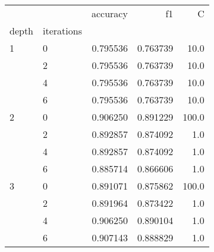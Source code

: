 \begin{tabular}{llrrr}
\toprule
  &   &  accuracy &        f1 &      C \\
depth & iterations &           &           &        \\
\midrule
1 & 0 &  0.795536 &  0.763739 &   10.0 \\
  & 2 &  0.795536 &  0.763739 &   10.0 \\
  & 4 &  0.795536 &  0.763739 &   10.0 \\
  & 6 &  0.795536 &  0.763739 &   10.0 \\
2 & 0 &  0.906250 &  0.891229 &  100.0 \\
  & 2 &  0.892857 &  0.874092 &    1.0 \\
  & 4 &  0.892857 &  0.874092 &    1.0 \\
  & 6 &  0.885714 &  0.866606 &    1.0 \\
3 & 0 &  0.891071 &  0.875862 &  100.0 \\
  & 2 &  0.891964 &  0.873422 &    1.0 \\
  & 4 &  0.906250 &  0.890104 &    1.0 \\
  & 6 &  0.907143 &  0.888829 &    1.0 \\
\bottomrule
\end{tabular}
